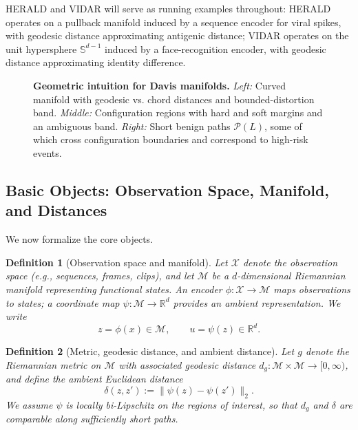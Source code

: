 \documentclass[11pt]{article}
\newtheorem{definition}{Definition}
\begin{document}
HERALD and VIDAR will serve as running examples throughout:
HERALD operates on a pullback manifold induced by a sequence encoder for viral spikes,
with geodesic distance approximating antigenic distance; VIDAR operates on the unit
hypersphere $\mathbb{S}^{d-1}$ induced by a face-recognition encoder, with geodesic
distance approximating identity difference.

\begin{figure}[t]
    \centering
    \caption{\textbf{Geometric intuition for Davis manifolds.}
    \emph{Left:} Curved manifold with geodesic vs. chord distances and bounded-distortion band.
    \emph{Middle:} Configuration regions with hard and soft margins and an ambiguous band.
    \emph{Right:} Short benign paths $\mathcal{P}(L)$, some of which cross configuration
    boundaries and correspond to high-risk events.}
    \label{fig:intuition}
\end{figure}

\subsection{Basic Objects: Observation Space, Manifold, and Distances}
\label{subsec:basic-objects}

We now formalize the core objects.

\begin{definition}[Observation space and manifold]
Let $\mathcal{X}$ denote the observation space (e.g., sequences, frames, clips), and let
$\mathcal{M}$ be a $d$-dimensional Riemannian manifold representing functional states.
An encoder $\phi:\mathcal{X} \to \mathcal{M}$ maps observations to states; a coordinate
map $\psi:\mathcal{M} \to \mathbb{R}^d$ provides an ambient representation. We write
\[
    z = \phi(x) \in \mathcal{M}, \qquad u = \psi(z) \in \mathbb{R}^d.
\]
\end{definition}

\begin{definition}[Metric, geodesic distance, and ambient distance]
Let $g$ denote the Riemannian metric on $\mathcal{M}$ with associated geodesic distance
$d_g:\mathcal{M}\times\mathcal{M} \to [0,\infty)$, and define the ambient Euclidean distance
\[
    \delta(z,z') := \|\psi(z) - \psi(z')\|_2.
\]
We assume $\psi$ is locally bi-Lipschitz on the regions of interest, so that $d_g$ and
$\delta$ are comparable along sufficiently short paths.
\end{definition}
\end{document}
